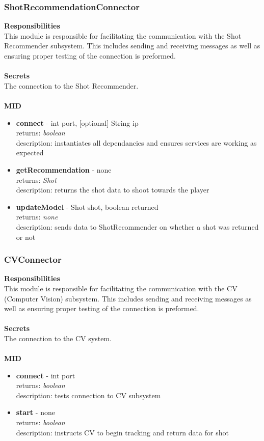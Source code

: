 \documentclass[11pt]{article}
\begin{document}
\subsubsection*{ShotRecommendationConnector}
\textbf{Responsibilities} \\
This module is responsible for facilitating the communication with the Shot Recommender subsystem. This includes sending and receiving messages as well as ensuring proper testing of the connection is preformed. \\ \\
\textbf{Secrets} \\
The connection to the Shot Recommender. \\ \\
\textbf{MID}
\begin{itemize}
\item \textbf{connect} - int port, [optional] String ip \\ returns: \textit{boolean} \\ description: instantiates all dependancies and ensures services are working as expected
\item \textbf{getRecommendation} - none \\ returns: \textit{Shot} \\ description: returns the shot data to shoot towards the player

\item \textbf{updateModel} - Shot shot, boolean returned \\ returns: \textit{none} \\ description: sends data to ShotRecommender on whether a shot was returned or not
\end{itemize}

\subsubsection*{CVConnector}
\textbf{Responsibilities} \\
This module is responsible for facilitating the communication with the CV (Computer Vision) subsystem. This includes sending and receiving messages as well as ensuring proper testing of the connection is preformed. \\ \\
\textbf{Secrets} \\
The connection to the CV system. \\ \\
\textbf{MID}
\begin{itemize}
\item \textbf{connect} - int port \\ returns: \textit{boolean} \\ description: tests connection to CV subsystem
\item \textbf{start} - none \\ returns: \textit{boolean} \\ description: instructs CV to begin tracking and return data for shot

\end{itemize}
\end{document}
